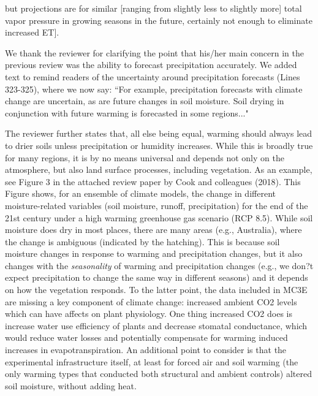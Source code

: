 \documentclass[11pt,a4paper]{letter}
\begin{document}
\begin{letter}{}
\begin{enumerate}
\begin{enumerate}
{but projections are for similar [ranging from slightly less to slightly more] total
vapor pressure in growing seasons in the future, certainly not enough to
eliminate increased ET].}
\par We thank the reviewer for clarifying the point that his/her main concern in the previous review was the ability to forecast precipitation accurately. We added text to remind readers of the uncertainty around precipitation forecasts (Lines 323-325), where we now say: ``For example, precipitation forecasts with climate change are uncertain, as are future changes in soil moisture. Soil drying in conjunction with future warming is forecasted in some regions..."

\par The reviewer further states that, all else being equal, warming should always lead to drier soils unless precipitation or humidity increases. While this is broadly true for many regions, it is by no means universal and depends not only on the atmosphere, but also land surface processes, including vegetation. As an example, see Figure 3 in the attached review paper by Cook and colleagues (2018). This Figure shows, for an ensemble of climate models, the change in different moisture-related variables (soil moisture, runoff, precipitation) for the end of the 21st century under a high warming greenhouse gas scenario (RCP 8.5). While soil moisture does dry in most places, there are many areas (e.g., Australia), where the change is ambiguous (indicated by the hatching). This is because soil moisture changes in response to warming and precipitation changes, but it also changes with the \emph{seasonality} of warming and precipitation changes (e.g., we don?t expect precipitation to change the same way in different seasons) and it depends on how the vegetation responds. To the latter point, the data included in MC3E are missing a key component of climate change: increased ambient CO2 levels which can have affects on plant physiology. One thing increased CO2 does is increase water use efficiency of plants and decrease stomatal conductance, which would reduce water losses and potentially compensate for warming induced increases in evapotranspiration. An additional point to consider is that the experimental infrastructure itself, at least for forced air and soil warming (the only warming types that conducted both structural and ambient controls) altered soil moisture, without adding heat. 

\end{enumerate}
\end{enumerate}
\end{letter}
\end{document}
